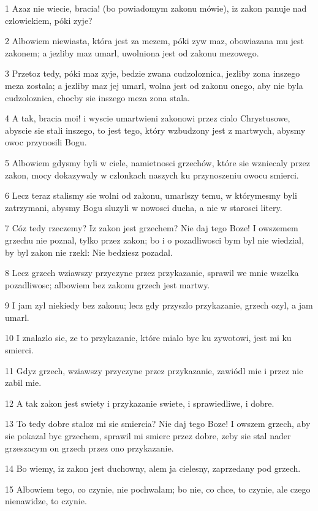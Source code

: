 \par 1 Azaz nie wiecie, bracia! (bo powiadomym zakonu mówie), iz zakon panuje nad czlowiekiem, póki zyje?
\par 2 Albowiem niewiasta, która jest za mezem, póki zyw maz, obowiazana mu jest zakonem; a jezliby maz umarl, uwolniona jest od zakonu mezowego.
\par 3 Przetoz tedy, póki maz zyje, bedzie zwana cudzoloznica, jezliby zona inszego meza zostala; a jezliby maz jej umarl, wolna jest od zakonu onego, aby nie byla cudzoloznica, chocby sie inszego meza zona stala.
\par 4 A tak, bracia moi! i wyscie umartwieni zakonowi przez cialo Chrystusowe, abyscie sie stali inszego, to jest tego, który wzbudzony jest z martwych, abysmy owoc przynosili Bogu.
\par 5 Albowiem gdysmy byli w ciele, namietnosci grzechów, które sie wzniecaly przez zakon, mocy dokazywaly w czlonkach naszych ku przynoszeniu owocu smierci.
\par 6 Lecz teraz stalismy sie wolni od zakonu, umarlszy temu, w którymesmy byli zatrzymani, abysmy Bogu sluzyli w nowosci ducha, a nie w starosci litery.
\par 7 Cóz tedy rzeczemy? Iz zakon jest grzechem? Nie daj tego Boze! I owszemem grzechu nie poznal, tylko przez zakon; bo i o pozadliwosci bym byl nie wiedzial, by byl zakon nie rzekl: Nie bedziesz pozadal.
\par 8 Lecz grzech wziawszy przyczyne przez przykazanie, sprawil we mnie wszelka pozadliwosc; albowiem bez zakonu grzech jest martwy.
\par 9 I jam zyl niekiedy bez zakonu; lecz gdy przyszlo przykazanie, grzech ozyl, a jam umarl.
\par 10 I znalazlo sie, ze to przykazanie, które mialo byc ku zywotowi, jest mi ku smierci.
\par 11 Gdyz grzech, wziawszy przyczyne przez przykazanie, zawiódl mie i przez nie zabil mie.
\par 12 A tak zakon jest swiety i przykazanie swiete, i sprawiedliwe, i dobre.
\par 13 To tedy dobre staloz mi sie smiercia? Nie daj tego Boze! I owszem grzech, aby sie pokazal byc grzechem, sprawil mi smierc przez dobre, zeby sie stal nader grzeszacym on grzech przez ono przykazanie.
\par 14 Bo wiemy, iz zakon jest duchowny, alem ja cielesny, zaprzedany pod grzech.
\par 15 Albowiem tego, co czynie, nie pochwalam; bo nie, co chce, to czynie, ale czego nienawidze, to czynie.
